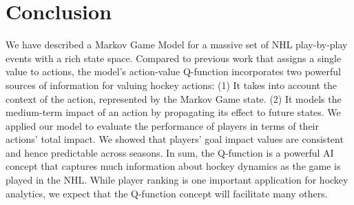 \documentclass[runningheads,a4paper]{llncs}
\begin{document}
\section{Conclusion}
We have described a Markov Game Model for a massive set of NHL play-by-play events with a rich state space. %
Compared to previous work that assigns a single value to actions, the model's action-value Q-function incorporates two powerful sources of information for valuing hockey actions: (1) It takes into account the context of the action, represented by the Markov Game state. (2) It models the medium-term impact of an action by propagating its effect to future states. %
%
We applied our model to evaluate the performance of players in terms of their actions' total impact.
We showed that players' goal impact values are consistent and hence predictable across seasons. %
In sum, the Q-function is a powerful AI concept that captures much information about hockey dynamics as the game is played in the NHL. While player ranking is one important application for hockey analytics, we expect that the Q-function concept will facilitate many others.

		
		
	
\end{document}

